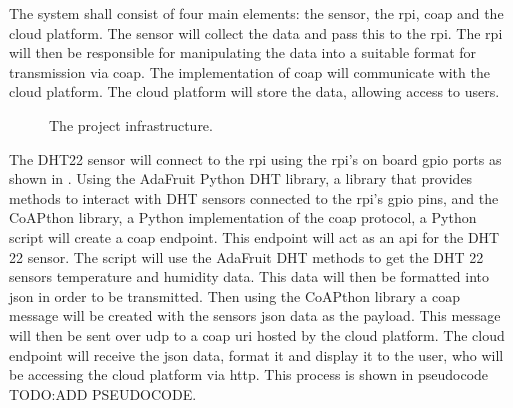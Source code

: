 The system shall consist of four main elements: the sensor, the \gls{rpi}, \gls{coap} and the cloud platform.
The sensor will collect the data and pass this to the \gls{rpi}. The \gls{rpi} will then be responsible for manipulating
the data into a suitable format for transmission via \gls{coap}. The implementation of \gls{coap} will communicate with
the cloud platform. The cloud platform will store the data, allowing access to users.

\begin{figure}[H]
    \centering
    \caption{\label{fig:proj_framework} The project infrastructure.}
\end{figure}


The DHT22 sensor will connect to the \gls{rpi} using the \gls{rpi}'s on board 
\gls{gpio} ports as shown in . 
Using the AdaFruit Python DHT library, a library that provides methods to interact 
with DHT sensors connected to the \gls{rpi}'s \gls{gpio} pins, 
and the CoAPthon library, a Python implementation of the \gls{coap} protocol, a 
Python script will create a \gls{coap} endpoint.
This endpoint will act as an \gls{api} for the DHT 22 sensor. 
The script will use the AdaFruit DHT methods to get the DHT 22 sensors temperature 
and humidity data. This data will then be formatted into \gls{json} in order to 
be transmitted. Then using the CoAPthon library a \gls{coap} message will be created 
with the sensors \gls{json} data as the payload. This message will then be sent over
\gls{udp} to a \gls{coap} \gls{uri} hosted by the cloud platform. The cloud endpoint 
will receive the \gls{json} data, format it and display it to the user, who will 
be accessing the cloud platform via \gls{http}. This process is shown in pseudocode
\\TODO:ADD PSEUDOCODE.


